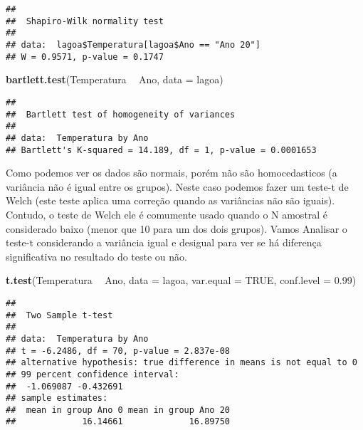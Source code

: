 \documentclass[14pt,titlepage, oneside, openany, a4paper]{book}
\newenvironment{Shaded}{\begin{snugshade}}{\end{snugshade}}
\newcommand{\DataTypeTok}[1]{\textcolor[rgb]{0.13,0.29,0.53}{#1}}
\newcommand{\FloatTok}[1]{\textcolor[rgb]{0.00,0.00,0.81}{#1}}
\newcommand{\KeywordTok}[1]{\textcolor[rgb]{0.13,0.29,0.53}{\textbf{#1}}}
\newcommand{\NormalTok}[1]{#1}
\newcommand{\OperatorTok}[1]{\textcolor[rgb]{0.81,0.36,0.00}{\textbf{#1}}}
\newcommand{\OtherTok}[1]{\textcolor[rgb]{0.56,0.35,0.01}{#1}}
\newcommand{\StringTok}[1]{\textcolor[rgb]{0.31,0.60,0.02}{#1}}
\begin{document}
\begin{Shaded}
\end{Shaded}

\begin{verbatim}
## 
##  Shapiro-Wilk normality test
## 
## data:  lagoa$Temperatura[lagoa$Ano == "Ano 20"]
## W = 0.9571, p-value = 0.1747
\end{verbatim}

\begin{Shaded}
\begin{Highlighting}[]
\KeywordTok{bartlett.test}\NormalTok{(Temperatura }\OperatorTok{~}\StringTok{ }\NormalTok{Ano, }\DataTypeTok{data =}\NormalTok{ lagoa)}
\end{Highlighting}
\end{Shaded}

\begin{verbatim}
## 
##  Bartlett test of homogeneity of variances
## 
## data:  Temperatura by Ano
## Bartlett's K-squared = 14.189, df = 1, p-value = 0.0001653
\end{verbatim}

Como podemos ver os dados são normais, porém não são homocedasticos (a variância não é igual entre os grupos). Neste caso podemos fazer um teste-t de Welch (este teste aplica uma correção quando as variâncias não são iguais). Contudo, o teste de Welch ele é comumente usado quando o N amostral é considerado baixo (menor que 10 para um dos dois grupos). Vamos Analisar o teste-t considerando a variância igual e desigual para ver se há diferença significativa no resultado do teste ou não.

\begin{Shaded}
\begin{Highlighting}[]
\KeywordTok{t.test}\NormalTok{(Temperatura }\OperatorTok{~}\StringTok{ }\NormalTok{Ano, }
       \DataTypeTok{data =}\NormalTok{ lagoa,}
       \DataTypeTok{var.equal =} \OtherTok{TRUE}\NormalTok{,}
       \DataTypeTok{conf.level =} \FloatTok{0.99}\NormalTok{)}
\end{Highlighting}
\end{Shaded}

\begin{verbatim}
## 
##  Two Sample t-test
## 
## data:  Temperatura by Ano
## t = -6.2486, df = 70, p-value = 2.837e-08
## alternative hypothesis: true difference in means is not equal to 0
## 99 percent confidence interval:
##  -1.069087 -0.432691
## sample estimates:
##  mean in group Ano 0 mean in group Ano 20 
##             16.14661             16.89750
\end{verbatim}
\end{document}
